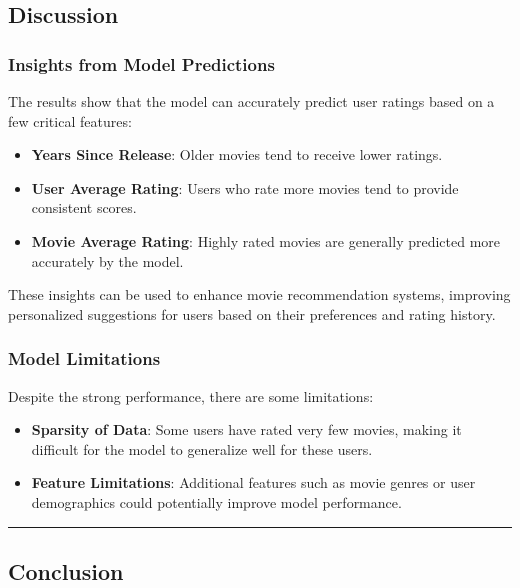\documentclass[
]{article}
\begin{document}
\subsection{Discussion}\label{discussion}

\subsubsection{Insights from Model
Predictions}\label{insights-from-model-predictions}

The results show that the model can accurately predict user ratings
based on a few critical features:

\begin{itemize}
\item
  \textbf{Years Since Release}: Older movies tend to receive lower
  ratings.
\item
  \textbf{User Average Rating}: Users who rate more movies tend to
  provide consistent scores.
\item
  \textbf{Movie Average Rating}: Highly rated movies are generally
  predicted more accurately by the model.
\end{itemize}

These insights can be used to enhance movie recommendation systems,
improving personalized suggestions for users based on their preferences
and rating history.

\subsubsection{Model Limitations}\label{model-limitations}

Despite the strong performance, there are some limitations:

\begin{itemize}
\item
  \textbf{Sparsity of Data}: Some users have rated very few movies,
  making it difficult for the model to generalize well for these users.
\item
  \textbf{Feature Limitations}: Additional features such as movie genres
  or user demographics could potentially improve model performance.
\end{itemize}

\begin{center}\rule{0.5\linewidth}{0.5pt}\end{center}

\subsection{Conclusion}\label{conclusion}
\end{document}
